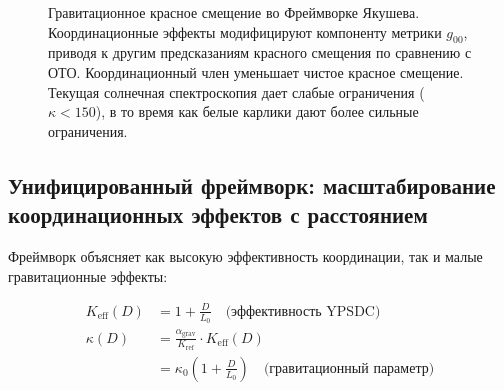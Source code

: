 \documentclass[11pt,a4paper]{article}
\begin{document}
\begin{figure}[htbp]
{
		}
		\caption{Гравитационное красное смещение во Фреймворке Якушева. Координационные эффекты модифицируют компоненту метрики $g_{00}$, приводя к другим предсказаниям красного смещения по сравнению с ОТО. Координационный член уменьшает чистое красное смещение. Текущая солнечная спектроскопия дает слабые ограничения ($\kappa < 150$), в то время как белые карлики дают более сильные ограничения.}
		\label{fig:redshift-detailed}
	\end{figure}
	\subsection{Унифицированный фреймворк: масштабирование координационных эффектов с расстоянием}
	
	Фреймворк объясняет как высокую эффективность координации, так и малые гравитационные эффекты:
	
	\begin{align}
		K_{\mathrm{eff}}(D) &= 1 + \frac{D}{L_0} \quad \text{(эффективность YPSDC)} \\
		\kappa(D) &= \frac{\alpha_{\text{grav}}}{K_{\text{ref}}} \cdot K_{\mathrm{eff}}(D) \\
		&= \kappa_0 \left(1 + \frac{D}{L_0}\right) \quad \text{(гравитационный параметр)}
	\end{align}
	
\end{document}
